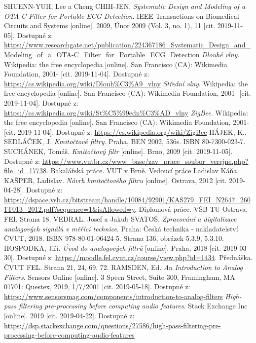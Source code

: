 \newpage
\begin{thebibliography}{999}
SHUENN-YUH, Lee a Cheng CHIH-JEN. \textit{Systematic Design and Modeling of a OTA-C Filter for Portable ECG Detection}. IEEE Transactions on Biomedical Circuits and Systems [online]. 2009, Únor 2009 (Vol. 3, no. 1), 11 [cit. 2019-11-05]. Dostupné z: \url{https://www.researchgate.net/publication/224367186_Systematic_Design_and_Modeling_of_a_OTA-C_Filter_for_Portable_ECG_Detection}
\textit{Dlouhé vlny}. Wikipedia: the free encyclopedia [online]. San Francisco (CA): Wikimedia Foundation, 2001- [cit. 2019-11-04]. Dostupné z: \url{https://cs.wikipedia.org/wiki/Dlouh%C3%A9_vlny}
\textit{Střední vlny}. Wikipedia: the free encyclopedia [online]. San Francisco (CA): Wikimedia Foundation, 2001- [cit. 2019-11-04]. Dostupné z: \url{https://cs.wikipedia.org/wiki/St%C5%99edn%C3%AD_vlny}
\textit{ZigBee}. Wikipedia: the free encyclopedia [online]. San Francisco (CA): Wikimedia Foundation, 2001- [cit. 2019-11-04]. Dostupné z: \url{https://cs.wikipedia.org/wiki/ZigBee}
HÁJEK, K., SEDLÁČEK, J. \textit{Kmitočtové  filtry}. Praha, BEN 2002, 536s. ISBN 80-7300-023-7.
SUCHÁNEK, Tomáš. \textit{Kmitočtový filtr} [online]. Brno, 2009 [cit. 2019-11-05]. Dostupné z: \url{https://www.vutbr.cz/www_base/zav_prace_soubor_verejne.php?file_id=17738}. Bakalářská práce. VUT v Brně. Vedoucí práce Ladislav Káňa.
KAŠPER, Ladislav. \textit{Návrh kmitočtového filtru} [online]. Ostrava, 2012 [cit. 2019-04-28]. Dostupné z: \url{https://dspace.vsb.cz/bitstream/handle/10084/92901/KAS279_FEI_N2647_2601T013_2012.pdf?sequence=1&isAllowed=y}. Diplomová práce. VŠB-TU Ostrava, FEI. Strana 18.
VEDRAL, Josef a Jakub SVATOŠ. \textit{Zpracování a digitalizace analogových signálů v měřící technice}. Praha: Česká technika - nakladatelství ČVUT, 2018. ISBN 978-80-01-06424-5. Strana 136, obrázek 5.3.9, 5.3.10.
HOSPODKA, Jiří. \textit{Úvod do analogových filtrů} [online]. Praha, 2018 [cit. 2019-03-30]. Dostupné z: \url{https://moodle.fel.cvut.cz/course/view.php?id=1434}. Přednáška. ČVUT FEL. Strana 21, 24, 69, 72.
RAMSDEN, Ed. \textit{An Introduction to Analog Filters}. Sensors Online [online]. 3 Speen Street, Suite 300, Framingham, MA 01701: Questex, 2019, 1/7/2001 [cit. 2019-05-18]. Dostupné z: \url{https://www.sensorsmag.com/components/introduction-to-analog-filters}
\textit{High-pass filtering pre-processing before computing audio features}. Stack Exchange Inc [online]. 2019 [cit. 2019-04-22]. Dostupné z: \url{https://dsp.stackexchange.com/questions/27586/high-pass-filtering-pre-processing-before-computing-audio-features}

\end{thebibliography}
